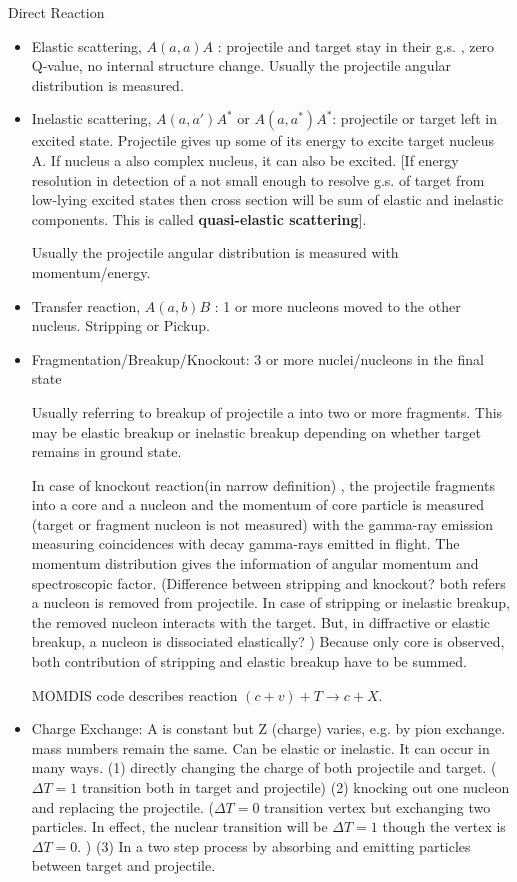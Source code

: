 \documentclass[11pt]{book}
\begin{document}
Direct Reaction
\begin{itemize}
\item Elastic scattering, $A(a, a)A$ : projectile and target stay in their g.s.
       , zero Q-value, no internal structure change.
       Usually the projectile angular distribution is measured. 
       
\item Inelastic scattering, $A(a,a')A^*$ or $A(a,a^*)A^*$:
projectile or target left in excited state. Projectile 
gives up some of its energy to excite target nucleus A. If
nucleus a also complex nucleus, it can also be excited.
[If energy resolution in detection of a not small enough to
resolve g.s. of target from low-lying excited states then cross
section will be sum of elastic and inelastic components. This
is called {\bf quasi-elastic scattering}].

Usually the projectile angular distribution is measured with momentum/energy. 

\item Transfer reaction, $A(a,b)B$ :
1 or more nucleons moved to the other nucleus. Stripping or Pickup. 


\item Fragmentation/Breakup/Knockout:
3 or more nuclei/nucleons in the final state

Usually referring to breakup of projectile
a into two or more fragments. This may be elastic breakup or
inelastic breakup depending on whether target remains in
ground state.

In case of knockout reaction(in narrow definition)
, the projectile fragments into a core and a nucleon
and the momentum of core particle is measured 
(target or fragment nucleon is not measured) with the gamma-ray emission
measuring coincidences with decay gamma-rays emitted in flight.
The momentum distribution gives the information of angular momentum and
spectroscopic factor.
(Difference between stripping and knockout? both refers a nucleon
is removed from projectile. In case of stripping or inelastic breakup,
the removed nucleon interacts with the target. But, in diffractive or
elastic breakup, a nucleon is dissociated elastically? )
Because only core is observed, both contribution
of stripping and elastic breakup have to be summed.

MOMDIS code describes reaction $(c+v)+T\to c+X$.

\item Charge Exchange:
A is constant but Z (charge) varies, e.g. by pion exchange.
mass numbers remain the
same. Can be elastic or inelastic. It can occur in many ways. 
(1) directly changing the charge of both projectile and target. 
    ($\Delta T=1$ transition both in target and projectile)
(2) knocking out one nucleon and replacing the projectile.
    ($\Delta T=0$ transition vertex but exchanging two particles.
    In effect, the nuclear transition will be $\Delta T=1$ though the
    vertex is $\Delta T=0$.
    )   
(3) In a two step process by absorbing and emitting particles between target
    and projectile.      


\end{itemize}
\end{document}
